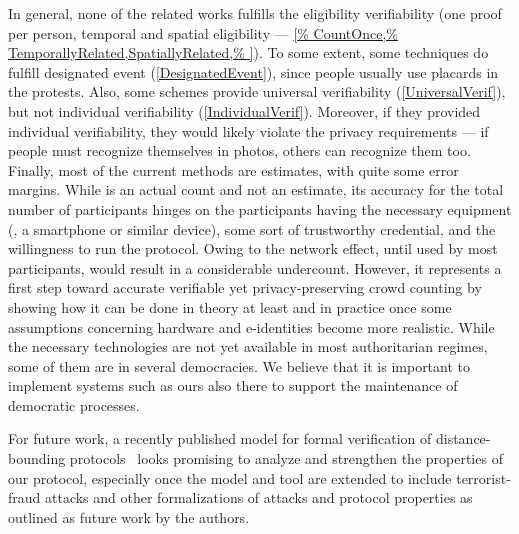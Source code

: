 In general, none of the related works fulfills the eligibility
verifiability (one proof per person, temporal and spatial eligibility ---
\cref{%
  CountOnce,%
  TemporallyRelated,SpatiallyRelated,%
}).
To some extent, some techniques do fulfill designated event (\cref{DesignatedEvent}), since people usually use placards in the protests.
Also, some schemes provide universal verifiability (\cref{UniversalVerif}), but not individual verifiability (\cref{IndividualVerif}).
Moreover, if they provided individual verifiability, they would likely violate 
the privacy requirements --- if people must recognize themselves in photos, 
others can recognize them too.
Finally, most of the current methods are estimates, with quite some error margins. 
While \PRIVO is an actual count and not an estimate, its accuracy for the total number of participants hinges on the participants having the necessary equipment (\ie, a smartphone or similar device), some sort of trustworthy credential, and the willingness to run the protocol. 
Owing to the network effect, until used by most participants, \PRIVO would result in a considerable undercount. 
However, it represents a first step toward accurate verifiable yet privacy-preserving crowd counting by showing how it can be done in theory at least and in practice once some assumptions concerning hardware and e-identities become more realistic. 
While the necessary technologies are not yet available in most authoritarian regimes, some of them are in several democracies. We believe that it is important to implement systems such as ours also there to support the maintenance of democratic processes.

For future work, a recently published model for formal verification of distance-bounding protocols~\cite{TamarinDB} looks promising to analyze and strengthen the properties of our protocol, especially once the model and tool are extended to include terrorist-fraud attacks and other formalizations of attacks and protocol properties as outlined as future work by the authors.

